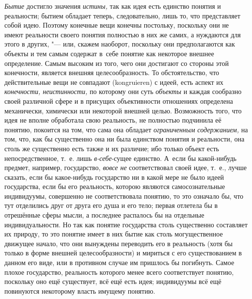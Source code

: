 {\em Бытие} достигло
значения {\em истины,}
так как идея есть единство понятия и реальности; бытием
обладает теперь, следовательно, лишь то, что представляет собой идею.
Поэтому конечные вещи конечны постольку, поскольку они не имеют реальности
своего понятия полностью в них же самих, а нуждаются для этого в других, "---
или, скажем наоборот, поскольку они предполагаются как
объекты и тем самым содержат в~себе понятие как некоторое внешнее
определение. Самым высоким из того, чего они достигают со стороны этой
конечности, является внешняя целесообразность. То обстоятельство, что
действительные вещи не совпадают (kongruieren) с идеей, есть
аспект их {\em конечности,
неистинности,} по которому они суть
{\em объекты} и каждая
сообразно своей различной сфере и в присущих объективности отношениях
определена механически, химически или некоторой внешней целью. Возможность
того, что идея не вполне обработала свою реальность, не полностью подчинила
её понятию, покоится на том, что сама она обладает
{\em ограниченным содержанием,}
на том, что, как бы существенно она ни была единством понятия
и реальности, она столь же существенно есть также и их различие; ибо
только объект есть непосредственное, т.~е. лишь
{\em в-себе}-сущее
единство. А~если бы какой-нибудь предмет, например, государство,
{\em вовсе не}
соответствовал своей идее, т.~е., лучше сказать, если бы
какое-нибудь государство ни в какой мере не было идеей государства, если бы
его реальность, которою являются самосознательные индивидуумы, совершенно
не соответствовала понятию, то это означало бы, что тут отделились друг от
друга его душа и его тело; первая отлетела бы в отрешённые сферы мысли, а
последнее распалось бы на отдельные индивидуальности. Но так как понятие
государства столь существенно составляет их природу, то это понятие имеет в
них бытие как столь могущественное движущее начало, что они вынуждены
переводить его в реальность (хотя бы только в форме внешней
целесообразности) и мириться с его существованием в данном его виде, или в
противном случае им пришлось бы погибнуть. Самое плохое государство,
реальность которого менее всего соответствует понятию, поскольку оно ещё
существует, всё ещё есть идея; индивидуумы всё ещё повинуются некоторому
власть имущему понятию.

